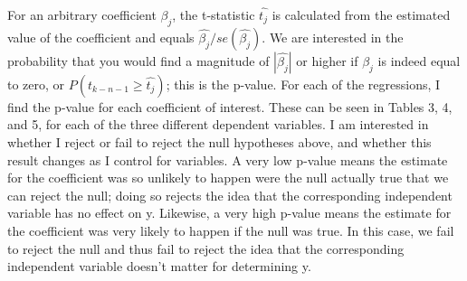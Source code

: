 \documentclass[a4paper]{article}
\begin{document}
For an arbitrary coefficient $\beta_j$, the t-statistic $\hat{t_j}$ is calculated from the estimated value of the coefficient and equals $\hat{\beta_j} / se(\hat{\beta_j})$. We are interested in the probability that you would find a magnitude of $|\hat{\beta_j}|$ or higher if $\beta_j$ is indeed equal to zero, or \(P(t_{k-n-1} \ge \hat{t_j})\); this is the p-value. For each of the regressions, I find the p-value for each coefficient of interest. These can be seen in Tables 3, 4, and 5, for each of the three different dependent variables. 
I am interested in whether I reject or fail to reject the null hypotheses above, and whether this result changes as I control for variables. A very low p-value means the estimate for the coefficient was so unlikely to happen were the null actually true that we can reject the null; doing so rejects the idea that the corresponding independent variable has no effect on y. Likewise, a very high p-value means the estimate for the coefficient was very likely to happen if the null was true. In this case, we fail to reject the null and thus fail to reject the idea that the corresponding independent variable doesn't matter for determining y.
\end{document}

